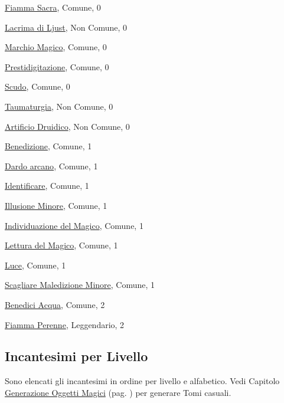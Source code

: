 \begin{multicols}{3}
{{\hyperlink{Fiamma Sacra}{Fiamma Sacra}, Comune, 0

\hyperlink{Lacrima di Ljust}{Lacrima di Ljust}, Non Comune, 0

\hyperlink{Marchio Magico}{Marchio Magico}, Comune, 0

\hyperlink{Prestidigitazione}{Prestidigitazione}, Comune, 0

\hyperlink{Scudo}{Scudo}, Comune, 0

\hyperlink{Taumaturgia}{Taumaturgia}, Non Comune, 0

\hyperlink{Artificio Druidico}{Artificio Druidico}, Non Comune, 0

\hyperlink{Benedizione}{Benedizione}, Comune, 1

\hyperlink{Dardo arcano}{Dardo arcano}, Comune, 1

\hyperlink{Identificare}{Identificare}, Comune, 1

\hyperlink{Illusione Minore}{Illusione Minore}, Comune, 1

\hyperlink{Individuazione del Magico}{Individuazione del Magico}, Comune, 1

\hyperlink{Lettura del Magico}{Lettura del Magico}, Comune, 1

\hyperlink{Luce}{Luce}, Comune, 1

\hyperlink{Scagliare Maledizione Minore}{Scagliare Maledizione Minore}, Comune, 1

\hyperlink{Benedici Acqua}{Benedici Acqua}, Comune, 2

\hyperlink{Fiamma Perenne}{Fiamma Perenne}, Leggendario, 2

}}

\end{multicols}

\subsection{Incantesimi per Livello}\hypertarget{elencoinc}{}

Sono elencati gli incantesimi in ordine per livello e alfabetico. Vedi Capitolo \hyperlink{CPergamene}{Generazione Oggetti Magici} (pag. \pageref{CPergamene}) per generare Tomi casuali.

